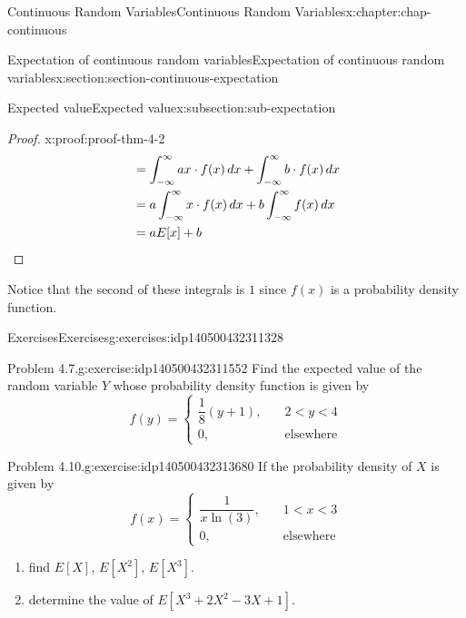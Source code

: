 \documentclass[oneside,10pt,]{book}
\newcommand{\qedhere}{\relax}
\newcommand{\lt}{<}
\newcommand{\amp}{&}
\begin{document}
\begin{chapterptx}{Continuous Random Variables}{}{Continuous Random Variables}{}{}{x:chapter:chap-continuous}
\begin{sectionptx}{Expectation of continuous random variables}{}{Expectation of continuous random variables}{}{}{x:section:section-continuous-expectation}
\begin{subsectionptx}{Expected value}{}{Expected value}{}{}{x:subsection:sub-expectation}
\begin{proof}{}{x:proof:proof-thm-4-2}
\begin{equation*}
\begin{aligned}[t]
\amp = \int_{-\infty}^\infty ax\cdot f(x)\,dx + \int_{-\infty}^\infty
b\cdot f(x)\,dx\\
\amp = a\int_{-\infty}^\infty x\cdot f(x)\,dx + b\int_{-\infty}^\infty
f(x)\,dx\\
\amp = aE[x] + b
\end{aligned}\qedhere
\end{equation*}
\end{proof}
 Notice that the second of these integrals is \(1\) since \(f(x)\) is a probability density function.%
\end{subsectionptx}
%
%
\typeout{************************************************}
\typeout{************************************************}
%
\begin{exercises-subsection}{Exercises}{}{Exercises}{}{}{g:exercises:idp140500432311328}
\begin{divisionexercise}{1}{Problem 4.7.}{}{g:exercise:idp140500432311552}%
Find the expected value of the random variable \(Y\) whose probability density function is given by%
\begin{equation*}
f(y) = \begin{cases}
\dfrac{1}{8}(y+1), \amp \quad 2 \lt y \lt 4\\
0, \amp \quad \text{elsewhere}\end{cases}
\end{equation*}
%
\end{divisionexercise}%
\begin{divisionexercise}{2}{Problem 4.10.}{}{g:exercise:idp140500432313680}%
If the probability density of \(X\) is given by%
\begin{equation*}
f(x) =
\begin{cases} \dfrac{1}{x\ln(3)}, \amp \quad 1 \lt x \lt 3\\
0, \amp \quad \text{elsewhere}\end{cases}
\end{equation*}
%
\begin{enumerate}[label=(\alph*)]
\item{}find \(E[X]\), \(E[X^2]\), \(E[X^3]\).%
\item{}determine the value of \(E[X^3 + 2X^2-3X+1]\).%
\end{enumerate}
%
\end{divisionexercise}%
\end{exercises-subsection}
%
%
\typeout{************************************************}
\typeout{************************************************}

\end{sectionptx}
\end{chapterptx}
\end{document}
